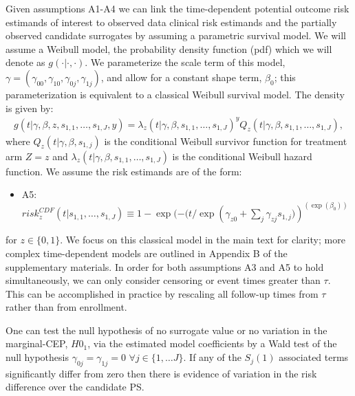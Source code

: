 \documentclass[times, doublespace]{simauth}
\begin{document}
Given assumptions A1-A4 we can link the time-dependent potential outcome risk estimands of interest to observed data clinical risk estimands and the partially observed candidate surrogates by assuming a parametric survival model. We will assume a Weibull model, the probability density function (pdf) which we will denote as $g(\cdot|\cdot,\cdot)$. We parameterize the scale term of this model, $\gamma=(\gamma_{00}, \gamma_{10},\gamma_{0j}, \gamma_{1j})$, and allow for a constant shape term, $\beta_{0}$; this parameterization is equivalent to a classical Weibull survival model. The density is given by:
\begin{eqnarray*}
g(t|\gamma, \beta, z, s_{1,1}, \ldots,s_{1,J}, y)=\lambda_z(t|\gamma, \beta, s_{1,1}, \ldots, s_{1,J})^{y} Q_z(t|\gamma, \beta, s_{1,1}, \ldots, s_{1,J}),
\end{eqnarray*}
where $Q_z(t|\gamma, \beta, s_{1,j})$ is the conditional Weibull survivor function for treatment arm $Z=z$ and $\lambda_z(t|\gamma, \beta, s_{1,1}, \ldots, s_{1,J})$ is the conditional Weibull hazard function. We assume the risk estimands are of the form:
\begin{itemize}
\item A5: $risk_{z}^{CDF}(t|s_{1,1}, \ldots, s_{1,J}) \equiv 1-\exp(-(t/\exp(\gamma_{z0}+\sum_j{\gamma_{zj}s_{1,j})})^{(\exp(\beta_{0}))}$
\end{itemize}
for $z\in \{0,1\}$. We focus on this classical model in the main text for clarity; more complex time-dependent models are outlined in Appendix B of the supplementary materials. In order for both assumptions A3 and A5 to hold simultaneously, we can only consider censoring or event times greater than $\tau$. This can be accomplished in practice by rescaling all follow-up times from $\tau$ rather than from enrollment.

One can test the null hypothesis of no surrogate value or no variation in the marginal-CEP, $H0_1$, via the estimated model coefficients by a Wald test of the null hypothesis $\gamma_{0j}=\gamma_{1j}=0$ $\forall j \in \{1,\ldots J\}$. If any of the $S_{j}(1)$ associated terms significantly differ from zero then there is evidence of variation in the risk difference over the candidate PS. 
\end{document}
